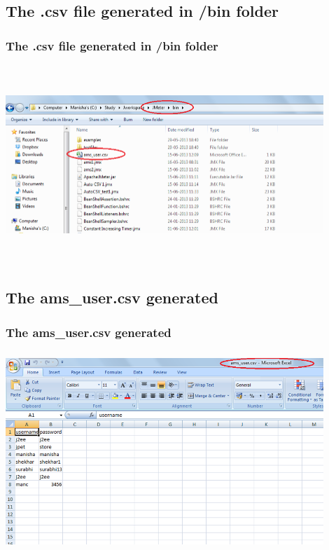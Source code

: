 \documentclass[12pt]{beamer}
\begin{document}
\subsection{The .csv file generated in /bin folder}
\begin{frame}[c]
\frametitle{The .csv file generated in /bin folder}
\includegraphics[width=12cm, height=7.5cm]{images/csvfile.png}
\end{frame}

\subsection{The ams\_user.csv generated}
\begin{frame}[c]
\frametitle{The ams\_user.csv generated}
\includegraphics[width=12cm, height=7.5cm]{images/csv.png}
\end{frame}

\end{document}
